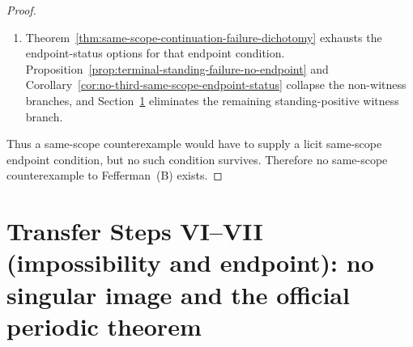 \begin{proof}
\begin{enumerate}[leftmargin=2.2em,itemsep=0.2em]
\item Theorem~\ref{thm:same-scope-continuation-failure-dichotomy} exhausts the endpoint-status options for that endpoint condition. Proposition~\ref{prop:terminal-standing-failure-no-endpoint} and Corollary~\ref{cor:no-third-same-scope-endpoint-status} collapse the non-witness branches, and Section~\ref{sec:singular-images-official-theorem} eliminates the remaining standing-positive witness branch.
\end{enumerate}
Thus a same-scope counterexample would have to supply a licit same-scope endpoint condition, but no such condition survives. Therefore no same-scope counterexample to Fefferman~(B) exists.
\end{proof}

\section{Transfer Steps VI--VII (impossibility and endpoint): no singular image and the official periodic theorem}\label{sec:singular-images-official-theorem}
